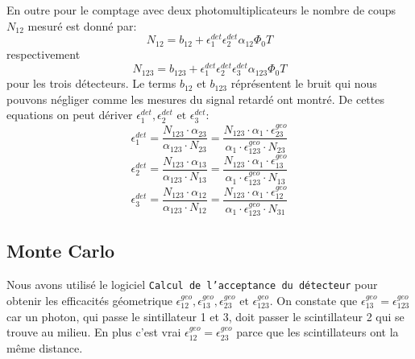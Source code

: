 \documentclass[a4paper,11pt,liststotocnumbered,bibtotocnumbered]{scrartcl}
\begin{document}
En outre pour le comptage avec deux photomultiplicateurs le nombre de coups $N_{12}$ mesuré est donné par:
\begin{equation*}
N_{12}=b_{12}+\epsilon_{1}^{det} \epsilon_{2}^{det}\alpha_{12}\Phi_0 T
\end{equation*}
respectivement
\begin{equation*}
N_{123}=b_{123}+\epsilon_{1}^{det} \epsilon_{2}^{det}\epsilon_{3}^{det}\alpha_{123}\Phi_0 T
\end{equation*}
pour les trois détecteurs. Le terms $b_{12}$ et $b_{123}$ réprésentent le bruit qui nous pouvons négliger comme les mesures du signal retardé ont montré. De cettes equations on peut dériver $\epsilon_{1}^{det},\epsilon_{2}^{det}\text{ et }\epsilon_{3}^{det}$:
\begin{equation*}
\epsilon_{1}^{det}=\frac{N_{123} \cdot \alpha_{23}}{\alpha_{123}\cdot N_{23}}=\frac{N_{123} \cdot \alpha_{1}\cdot \epsilon_{23}^{geo}}{\alpha_{1}\cdot \epsilon_{123}^{geo}\cdot N_{23}}
\end{equation*}
\begin{equation*}
\epsilon_{2}^{det}=\frac{N_{123} \cdot \alpha_{13}}{\alpha_{123}\cdot N_{13}}=\frac{N_{123} \cdot \alpha_{1}\cdot \epsilon_{13}^{geo}}{\alpha_{1}\cdot \epsilon_{123}^{geo}\cdot N_{13}}
\end{equation*}
\begin{equation*}
\epsilon_{3}^{det}=\frac{N_{123} \cdot \alpha_{12}}{\alpha_{123}\cdot N_{12}}=\frac{N_{123} \cdot \alpha_{1}\cdot \epsilon_{12}^{geo}}{\alpha_{1}\cdot \epsilon_{123}^{geo}\cdot N_{31}}
\end{equation*}
  \subsection{Monte Carlo}
   Nous avons utilisé le logiciel \texttt{Calcul de l'acceptance du détecteur} pour obtenir les efficacités géometrique $\epsilon_{12}^{geo},\epsilon_{13}^{geo}, \epsilon_{23}^{geo}\text{ et }\epsilon_{123}^{geo}$. On constate que $\epsilon_{13}^{geo}=\epsilon_{123}^{geo}$ car un photon, qui passe le sintillateur 1 et 3, doit passer le scintillateur 2 qui se trouve au milieu. En plus c'est vrai $\epsilon_{12}^{geo}=\epsilon_{23}^{geo}$ parce que les scintillateurs ont la même distance.
\end{document}
